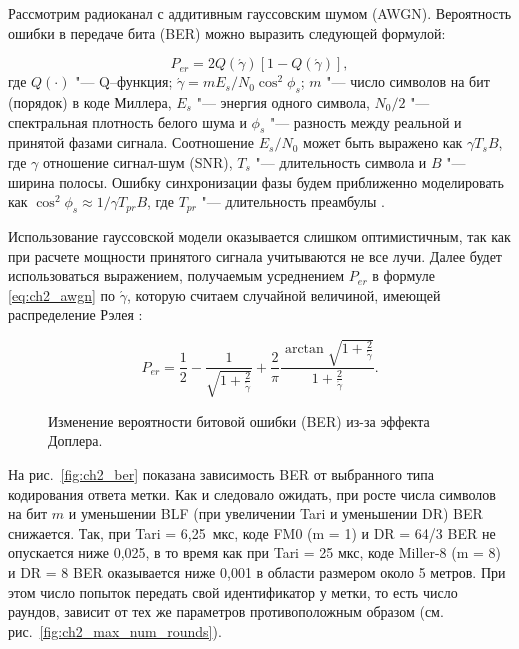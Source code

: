 Рассмотрим радиоканал с аддитивным гауссовским шумом (AWGN). Вероятность ошибки в передаче бита (BER) можно выразить следующей формулой:

\begin{equation}
	P_{er} = 2Q(\acute{\gamma})[1-Q(\acute{\gamma})],
	\label{eq:ch2_awgn}
\end{equation}
где $Q(\cdot)$ "--- Q--функция; $\acute{\gamma} = mE_s/N_0\cos^2{\phi_s}$; $m$ "--- число символов на бит (порядок) в коде Миллера, $E_s$ "--- энергия одного символа, $N_0/2$ "--- спектральная плотность белого шума и $\phi_s$ "--- разность между реальной и принятой фазами сигнала. Соотношение $E_s/N_0$ может быть выражено как $\gamma T_s B$, где $\gamma$ отношение сигнал-шум (SNR), $T_s$ "--- длительность символа и $B$ "--- ширина полосы. Ошибку синхронизации фазы будем приближенно моделировать как $\cos^2{\phi_s} \approx 1/\gamma T_{pr}B$, где $T_{pr}$ "--- длительность преамбулы \cite{RFID_JRFID2017}.

Использование гауссовской модели оказывается слишком оптимистичным, так как при расчете мощности принятого сигнала учитываются не все лучи. Далее будет использоваться выражением, получаемым усреднением $P_{er}$ в формуле \eqref{eq:ch2_awgn} по $\acute{\gamma}$, которую считаем случайной величиной, имеющей распределение Рэлея \cite{Lazaro2009}:

$$
	P_{er} = \frac{1}{2} - \frac{1}{\sqrt{1+\frac{2}{\acute{\gamma}}}} +
			 \frac{2}{\pi}\frac{\arctan{\sqrt{1+\frac{2}{\acute{\gamma}}}}}{1+\frac{2}{\acute{\gamma}}}.
$$

\begin{figure}[h]
	\caption{Изменение вероятности битовой ошибки (BER) из-за эффекта Доплера.}
	\label{fig:ch2_ber_doppler}
\end{figure}

На рис.~\ref{fig:ch2_ber} показана зависимость BER от выбранного типа кодирования ответа метки. Как и следовало ожидать, при росте числа символов на бит $m$ и уменьшении BLF (при увеличении Tari и уменьшении DR) BER снижается. Так, при Tari = 6,25~мкс, коде FM0 (m = 1) и DR = 64/3 BER не опускается ниже 0,025, в то время как при Tari = 25 мкс, коде Miller-8 (m = 8) и DR = 8 BER оказывается ниже 0,001 в области размером около 5 метров. При этом число попыток передать свой идентификатор у метки, то есть число раундов, зависит от тех же параметров противоположным образом (см. рис.~\ref{fig:ch2_max_num_rounds}).

